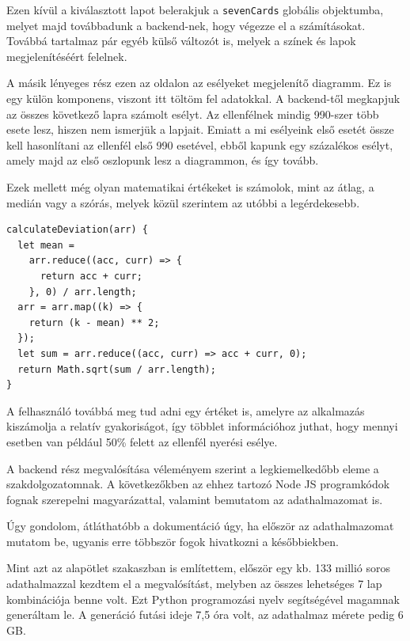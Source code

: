 Ezen kívül a kiválasztott lapot belerakjuk a \texttt{sevenCards} globális objektumba, melyet majd továbbadunk a backend-nek, hogy végezze el a számításokat. Továbbá tartalmaz pár egyéb külső változót is, melyek a színek és lapok megjelenítéséért felelnek.

A másik lényeges rész ezen az oldalon az esélyeket megjelenítő diagramm. Ez is egy külön komponens, viszont itt töltöm fel adatokkal. A backend-től megkapjuk az összes következő lapra számolt esélyt. Az ellenfélnek mindig 990-szer több esete lesz, hiszen nem ismerjük a lapjait. Emiatt a mi esélyeink első esetét össze kell hasonlítani az ellenfél első 990 esetével, ebből kapunk egy százalékos esélyt, amely majd az első oszlopunk lesz a diagrammon, és így tovább. 

Ezek mellett még olyan matematikai értékeket is számolok, mint az átlag, a medián vagy a szórás, melyek közül szerintem az utóbbi a legérdekesebb.

\begin{lstlisting}[style=htmlcssjs]
calculateDeviation(arr) {
  let mean =
    arr.reduce((acc, curr) => {
      return acc + curr;
    }, 0) / arr.length;
  arr = arr.map((k) => {
    return (k - mean) ** 2;
  });
  let sum = arr.reduce((acc, curr) => acc + curr, 0);
  return Math.sqrt(sum / arr.length);
}
\end{lstlisting}

A felhasználó továbbá meg tud adni egy értéket is, amelyre az alkalmazás kiszámolja a relatív gyakoriságot, így többlet információhoz juthat, hogy mennyi esetben van például 50\% felett az ellenfél nyerési esélye.


A backend rész megvalósítása véleményem szerint a legkiemelkedőbb eleme a szakdolgozatomnak. A következőkben az ehhez tartozó Node JS programkódok fognak szerepelni magyarázattal, valamint bemutatom az adathalmazomat is.


Úgy gondolom, átláthatóbb a dokumentáció úgy, ha először az adathalmazomat mutatom be, ugyanis erre többször fogok hivatkozni a későbbiekben. 

Mint azt az alapötlet szakaszban is említettem, először egy kb. 133 millió soros adathalmazzal kezdtem el a megvalósítást, melyben az összes lehetséges 7 lap kombinációja benne volt. Ezt Python programozási nyelv segítségével magamnak generáltam le. A generáció futási ideje 7,5 óra volt, az adathalmaz mérete pedig 6 GB.

